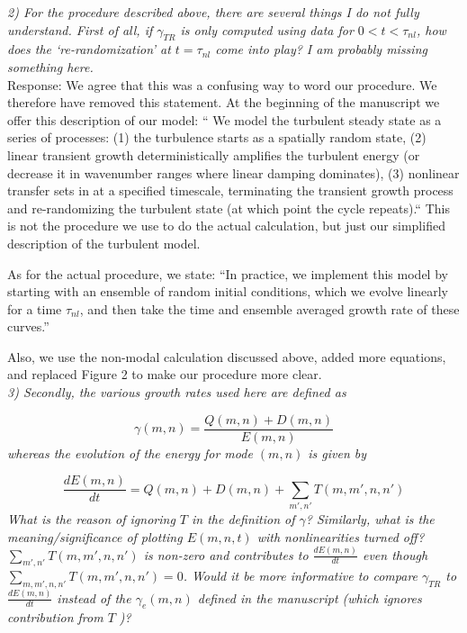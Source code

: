 \documentclass[12pt]{article}
\def\beq{\begin{equation}}
\def\eeq{\end{equation}}
\newcommand{\diff}[2]{\frac{d#1}{d#2}}
\begin{document}
\emph{2) For the procedure described above, there are several things I do not fully understand. First of
all, if $\gamma_{TR}$ is only computed using data for $0 < t < \tau_{nl}$, how does the ‘re-randomization’ at $t = \tau_{nl}$
come into play? I am probably missing something here.} \\


Response: We agree that this was a confusing way to word our
procedure. We therefore have removed this statement. At the beginning of the manuscript we offer this description of our model:
`` We model the turbulent steady state as a series of processes:  (1) the turbulence starts as a spatially random state, (2) linear transient growth deterministically amplifies the turbulent energy (or
decrease it in wavenumber ranges where linear damping dominates), (3) nonlinear transfer sets in at a specified timescale, terminating the transient growth process and re-randomizing the turbulent state (at which point the cycle repeats).`` This is not the procedure we use to do the actual calculation, but just our simplified description of the turbulent model.

As for the actual procedure, we state: ``In practice, we implement this model by starting with an ensemble of random initial conditions, which we evolve linearly for a time $\tau_{nl}$, 
and then take the time and ensemble averaged growth rate of these curves.''

Also, we use the non-modal calculation discussed above, added more equations, and replaced Figure 2 to make our procedure more clear.
\\


\emph{3) Secondly, the various growth rates used here are defined as}

\beq
\gamma(m,n) = \frac{Q(m,n) + D(m,n)}{E(m,n)} \nonumber
\eeq
\emph{whereas the evolution of the energy for mode $(m, n)$ is given by}

\beq
\diff{E(m,n)}{t} = Q(m,n) + D(m,n) + \sum_{m',n'} T(m,m',n,n') \nonumber
\eeq
\emph{What is the reason of ignoring $T$ in the definition of $\gamma$? Similarly, what is the meaning/significance
of plotting $E(m, n, t)$ with nonlinearities turned off?  $\sum_{m',n'} T(m,m',n,n')$ is non-zero and contributes to 
$\diff{E(m, n)}{t}$ even though $\sum_{m,m',n,n'} T(m,m',n,n') = 0$. Would it be more informative
to compare $\gamma_{TR}$ to $\diff{E(m, n)}{t}$ instead of the $\gamma_e (m, n)$ defined in the manuscript (which ignores
contribution from $T$ )?} \\
\end{document}
